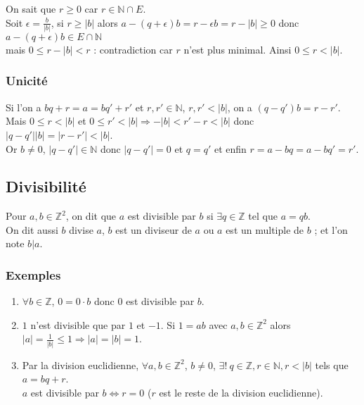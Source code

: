 \documentclass[a4paper,10pt]{book} %
\newcommand{\N}{\mathbb{N}}
\newcommand{\Z}{\mathbb{Z}}
\newcommand{\abs}[1]{\left|#1\right|}
\begin{document}
On sait que $r\geq 0$ car $r\in \N\cap E$.\\

Soit $\epsilon=\frac{b}{\abs{b}}$, si $r\geq |b|$ alors $a-(q+\epsilon)b=r-\epsilon b=r-|b|\geq 0$ donc $a-(q+\epsilon)b\in E\cap \N$\\
mais $0\leq r-|b|<r$ : contradiction car $r$ n'est plus minimal. Ainsi $0\leq r <|b|$.

\subsubsection{Unicité}
Si l'on a $bq+r=a=bq'+r'$ et $r,r'\in \N$, $r,r'<|b|$, on a $(q-q')b=r-r'$.\\

Mais $0\leq r <|b|$ et $0\leq r'<|b| \Rightarrow -|b|<r'-r<|b|$ donc $|q-q'| |b|=|r-r'|<|b|$.\\

Or $b\neq 0$, $|q-q'|\in \N$ donc $|q-q'|=0$ et $q=q'$ et enfin $r=a-bq=a-bq'=r'$.

\newpage

\subsection{Divisibilité}
Pour $a,b\in \Z^2$, on dit que $a$ est divisible par $b$ si $\exists q\in \Z$ tel que $a=qb$.\\

On dit aussi $b$ divise $a$, $b$ est un diviseur de $a$ ou $a$ est un multiple de $b$ ; et l'on note $b|a$.

\subsubsection{Exemples}
\begin{enumerate}
\item $\forall b\in \Z$, $0=0\cdot b$ donc $0$ est divisible par $b$.

\item $1$ n'est divisible que par $1$ et $-1$. Si $1=ab$ avec $a,b\in \Z^2$ alors $|a|=\frac{1}{|b|}\leq 1
\Rightarrow |a|=|b|=1$.

\item Par la division euclidienne, $\forall a,b\in \Z^2$, $b\neq 0$, $\exists !~q\in \Z, r\in \N, r<|b|$ tels que $a=bq+r$.\\
$a$ est divisible par $b \Leftrightarrow r=0$ ($r$ est le reste de la division euclidienne).
\end{enumerate}
\end{document}
